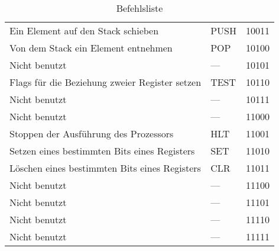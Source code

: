 \begin{table}[htb]
\begin{tabular}{lll}
Ein Element auf den Stack schieben				& PUSH  	& 10011\\
Von dem Stack ein Element entnehmen				& POP   	& 10100\\
Nicht benutzt									& ---   	& 10101\\
Flags für die Beziehung zweier Register setzen	& TEST  	& 10110\\
Nicht benutzt									& ---   	& 10111\\
Nicht benutzt									& ---   	& 11000\\
Stoppen der Ausführung des Prozessors			& HLT   	& 11001\\
Setzen eines bestimmten Bits eines Registers	& SET   	& 11010\\
Löschen eines bestimmten Bits eines Registers	& CLR   	& 11011\\
Nicht benutzt									& ---   	& 11100\\
Nicht benutzt									& ---   	& 11101\\
Nicht benutzt									& ---   	& 11110\\
Nicht benutzt									& ---   	& 11111\\
\bottomrule
\end{tabular}
\caption{Befehlsliste}
\label{tab:befehlsliste}
\end{table}
